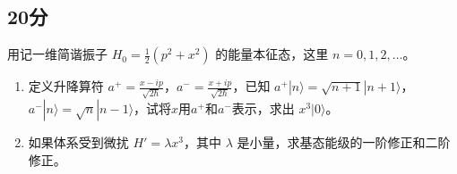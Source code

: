 \subsection{20分}
用记一维简谐振子 $H_0 = \frac{1}{2}(p^2 + x^2)$ 的能量本征态，这里 $n=0,1,2,\dots$。
\begin{enumerate}
    \item 定义升降算符 $a^+ = \frac{x - ip}{\sqrt{2\hbar}}$，$a^- = \frac{x + ip}{\sqrt{2\hbar}}$，已知 $a^+ |n\rangle = \sqrt{n+1}|n+1\rangle$，$a^- |n\rangle = \sqrt{n} |n-1\rangle$，试将$x$用$a^+$和$a^-$表示，求出 $x^3|0\rangle$。
    
    \item 如果体系受到微扰 $H' = \lambda x^3$，其中 $\lambda$ 是小量，求基态能级的一阶修正和二阶修正。
\end{enumerate}